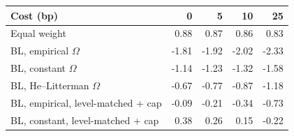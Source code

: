\begin{tabular}{lrrrr}
\toprule
Cost (bp) & 0 & 5 & 10 & 25 \\
\midrule
Equal weight & 0.88 & 0.87 & 0.86 & 0.83 \\
BL, empirical $\Omega$ & -1.81 & -1.92 & -2.02 & -2.33 \\
BL, constant $\Omega$ & -1.14 & -1.23 & -1.32 & -1.58 \\
BL, He--Litterman $\Omega$ & -0.67 & -0.77 & -0.87 & -1.18 \\
BL, empirical, level-matched + cap & -0.09 & -0.21 & -0.34 & -0.73 \\
BL, constant, level-matched + cap & 0.38 & 0.26 & 0.15 & -0.22 \\
\bottomrule
\end{tabular}
